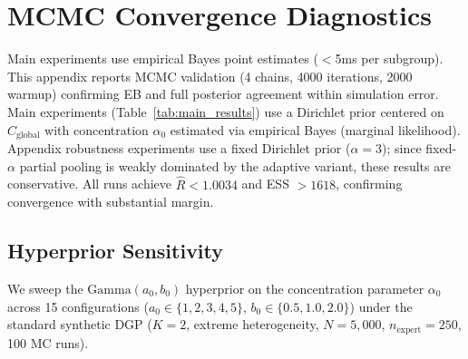 \section{MCMC Convergence Diagnostics}
\label{app:mcmc}

Main experiments use empirical Bayes point estimates ($<$5ms per subgroup).
This appendix reports MCMC validation (4 chains, 4000 iterations, 2000 warmup) confirming EB and full posterior agreement within simulation error.
Main experiments (Table~\ref{tab:main_results}) use a Dirichlet prior centered on $\hat{C}_{\text{global}}$ with concentration $\alpha_0$ estimated via empirical Bayes (marginal likelihood).
Appendix robustness experiments use a fixed Dirichlet prior ($\alpha{=}3$); since fixed-$\alpha$ partial pooling is weakly dominated by the adaptive variant, these results are conservative.
All runs achieve $\hat{R} < 1.0034$ and ESS $> 1618$, confirming convergence with substantial margin.

\begin{table}[h]
\centering
\small
{}
\caption{MCMC convergence diagnostics for the hierarchical Bayesian estimator. All configurations satisfy convergence criteria with substantial margin.}
\label{tab:mcmc}
\end{table}

\subsection{Hyperprior Sensitivity}
\label{app:hyperprior}

We sweep the $\text{Gamma}(a_0, b_0)$ hyperprior on the concentration parameter $\alpha_0$ across 15 configurations ($a_0 \in \{1, 2, 3, 4, 5\}$, $b_0 \in \{0.5, 1.0, 2.0\}$) under the standard synthetic DGP ($K{=}2$, extreme heterogeneity, $N{=}5{,}000$, $n_{\text{expert}}{=}250$, 100 MC runs).

